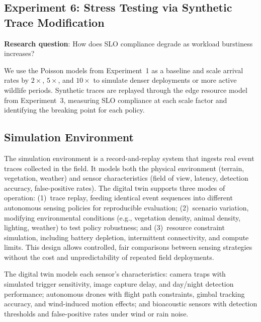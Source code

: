 \documentclass[letterpaper,twocolumn,10pt]{article}
\begin{document}
\subsection{Experiment 6: Stress Testing via Synthetic Trace Modification}
\label{sec:exp6}

\textbf{Research question}: How does SLO compliance degrade as workload burstiness increases?

We use the Poisson models from Experiment~1 as a baseline and scale arrival rates by $2\times$, $5\times$, and $10\times$ to simulate denser deployments or more active wildlife periods. Synthetic traces are replayed through the edge resource model from Experiment~3, measuring SLO compliance at each scale factor and identifying the breaking point for each policy.

\subsection{Simulation Environment}
\label{sec:digital_twin}

The simulation environment is a record-and-replay system that ingests real event traces collected in the field. It models both the physical environment (terrain, vegetation, weather) and sensor characteristics (field of view, latency, detection accuracy, false-positive rates). The digital twin supports three modes of operation: (1)~trace replay, feeding identical event sequences into different autonomous sensing policies for reproducible evaluation; (2)~scenario variation, modifying environmental conditions (e.g., vegetation density, animal density, lighting, weather) to test policy robustness; and (3)~resource constraint simulation, including battery depletion, intermittent connectivity, and compute limits. This design allows controlled, fair comparisons between sensing strategies without the cost and unpredictability of repeated field deployments.

The digital twin models each sensor’s characteristics: camera traps with simulated trigger sensitivity, image capture delay, and day/night detection performance; autonomous drones with flight path constraints, gimbal tracking accuracy, and wind-induced motion effects; and bioacoustic sensors with detection thresholds and false-positive rates under wind or rain noise.
\end{document}
